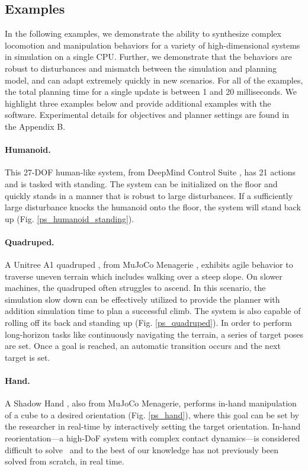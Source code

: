 \subsection{Examples}

In the following examples, we demonstrate the ability to synthesize complex locomotion and manipulation behaviors for a variety of high-dimensional systems in simulation on a single CPU. Further, we demonstrate that the behaviors are robust to disturbances and mismatch between the simulation and planning model, and can adapt extremely quickly in new scenarios. For all of the examples, the total planning time for a single update is between 1 and 20 milliseconds. We highlight three examples below and provide additional examples with the software. Experimental details for objectives and planner settings are found in the Appendix B.

\paragraph{Humanoid.}
This 27-DOF human-like system, from DeepMind Control Suite \cite{tunyasuvunakool2020dm_control}, has 21 actions and is tasked with standing. The system can be initialized on the floor and quickly stands in a manner that is robust to large disturbances. If a sufficiently large disturbance knocks the humanoid onto the floor, the system will stand back up (Fig. \ref{ps_humanoid_standing}).

\paragraph{Quadruped.}
A Unitree A1 quadruped \cite{unitree2022a1}, from MuJoCo Menagerie \cite{menagerie2022github}, exhibits agile behavior to traverse uneven terrain which includes walking over a steep slope. On slower machines, the quadruped often struggles to ascend. In this scenario, the simulation slow down can be effectively utilized to provide the planner with addition simulation time to plan a successful climb. The system is also capable of rolling off its back and standing up (Fig. \ref{ps_quadruped}). In order to perform long-horizon tasks like continuously navigating the terrain, a series of target poses are set. Once a goal is reached, an automatic transition occurs and the next target is set. 

\paragraph{Hand.}
A Shadow Hand \cite{tuffield2003shadow}, also from MuJoCo Menagerie, performs in-hand manipulation of a cube to a desired orientation (Fig. \ref{ps_hand}), where this goal can be set by the researcher in real-time by interactively setting the target orientation. In-hand reorientation---a high-DoF system with complex contact dynamics---is considered difficult to solve~\cite{chen2022system} and to the best of our knowledge has not previously been solved from scratch, in real time.

